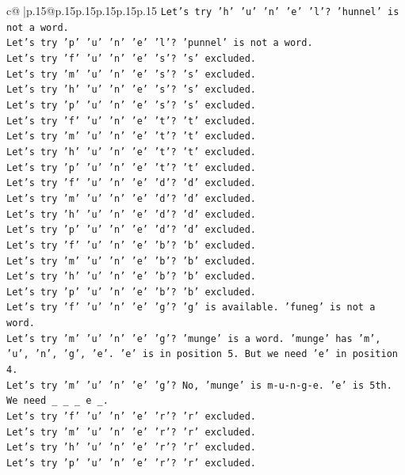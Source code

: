 \documentclass{article}
\begin{document}
{\begin{supertabular}{c@{$\;$}|p{.15\linewidth}@{}p{.15\linewidth}p{.15\linewidth}p{.15\linewidth}p{.15\linewidth}p{.15\linewidth}}
{{{\texttt{Let's try 'h' 'u' 'n' 'e' 'l'? 'hunnel' is not a word.} \\
\texttt{Let's try 'p' 'u' 'n' 'e' 'l'? 'punnel' is not a word.} \\
\texttt{Let's try 'f' 'u' 'n' 'e' 's'? 's' excluded.} \\
\texttt{Let's try 'm' 'u' 'n' 'e' 's'? 's' excluded.} \\
\texttt{Let's try 'h' 'u' 'n' 'e' 's'? 's' excluded.} \\
\texttt{Let's try 'p' 'u' 'n' 'e' 's'? 's' excluded.} \\
\texttt{Let's try 'f' 'u' 'n' 'e' 't'? 't' excluded.} \\
\texttt{Let's try 'm' 'u' 'n' 'e' 't'? 't' excluded.} \\
\texttt{Let's try 'h' 'u' 'n' 'e' 't'? 't' excluded.} \\
\texttt{Let's try 'p' 'u' 'n' 'e' 't'? 't' excluded.} \\
\texttt{Let's try 'f' 'u' 'n' 'e' 'd'? 'd' excluded.} \\
\texttt{Let's try 'm' 'u' 'n' 'e' 'd'? 'd' excluded.} \\
\texttt{Let's try 'h' 'u' 'n' 'e' 'd'? 'd' excluded.} \\
\texttt{Let's try 'p' 'u' 'n' 'e' 'd'? 'd' excluded.} \\
\texttt{Let's try 'f' 'u' 'n' 'e' 'b'? 'b' excluded.} \\
\texttt{Let's try 'm' 'u' 'n' 'e' 'b'? 'b' excluded.} \\
\texttt{Let's try 'h' 'u' 'n' 'e' 'b'? 'b' excluded.} \\
\texttt{Let's try 'p' 'u' 'n' 'e' 'b'? 'b' excluded.} \\
\texttt{Let's try 'f' 'u' 'n' 'e' 'g'? 'g' is available. 'funeg' is not a word.} \\
\texttt{Let's try 'm' 'u' 'n' 'e' 'g'? 'munge' is a word. 'munge' has 'm', 'u', 'n', 'g', 'e'. 'e' is in position 5. But we need 'e' in position 4.} \\
\texttt{Let's try 'm' 'u' 'n' 'e' 'g'? No, 'munge' is m{-}u{-}n{-}g{-}e. 'e' is 5th.} \\
\texttt{We need \_ \_ \_ e \_.} \\
\texttt{Let's try 'f' 'u' 'n' 'e' 'r'? 'r' excluded.} \\
\texttt{Let's try 'm' 'u' 'n' 'e' 'r'? 'r' excluded.} \\
\texttt{Let's try 'h' 'u' 'n' 'e' 'r'? 'r' excluded.} \\
\texttt{Let's try 'p' 'u' 'n' 'e' 'r'? 'r' excluded.} \\
}}}
\end{supertabular}}
\end{document}
